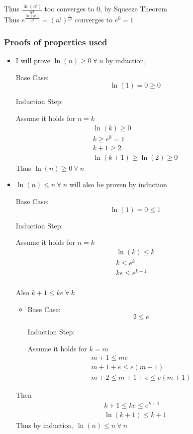 \documentclass{article}
\begin{document}
Thus \(\frac{\ln(n!)}{n^2}\) too converges to \(0\), by Squeeze Theorem
\\

Thus \(e^{\frac{\ln(n!)}{n^2}} = (n!)^{\frac{1}{n^2}}\) converges to \(e^0 = 1\)
\\

\subsubsection*{Proofs of properties used}

\begin{itemize}
    \item I will prove \(\ln(n) \geq 0 \ \forall \ n\) by induction,

    Base Case:
    \[
    \ln(1) = 0 \geq 0
    \]

    Induction Step:

    Assume it holds for \(n = k\)
    \begin{align*}
        \ln(k) \geq 0 \\
        k \geq e^0 = 1 \\
        k + 1 \geq 2 \\
        \ln(k+1) \geq \ln(2) \geq 0    
    \end{align*}
    Thus \(\ln(n) \geq 0 \ \forall \ n\) 
    \\

    \item \(\ln(n) \leq n \ \forall \ n\) will also be proven by induction

    Base Case:
    \[
    \ln(1) = 0 \leq 1
    \]

    Induction Step:

    Assume it holds for \(n=k\)
    \begin{align*}
        \ln(k) \leq k \\
        k \leq e^k \\
        ke \leq e^{k+1} \\
    \end{align*}

    Also \(k + 1 \leq ke \ \forall \ k\)
    
    \begin{itemize}
        \item Base Case:
    \[
    2 \leq e
    \]

    Induction Step:

    Assume it holds for \(k = m\)
    \begin{align*}
        m + 1 \leq me \\
        m + 1 + e \leq e(m+1) \\
        m+ 2 \leq m+ 1 + e \leq e(m+1)
    \end{align*}
    \end{itemize}

    Then 
    \begin{align*}
        k + 1 \leq ke \leq e^{k +1 }\\
        \ln(k+1) \leq k + 1
    \end{align*}
    Thus by induction, \(\ln(n) \leq n \ \forall \ n\)
\end{itemize}
\end{document}
